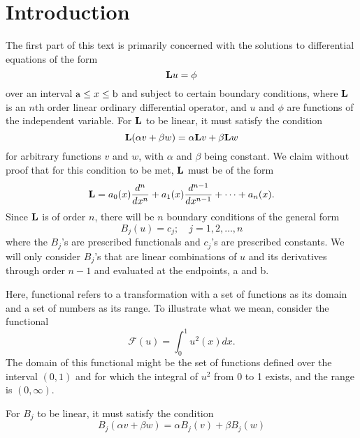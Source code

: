 \section{Introduction}
The first part of this text is primarily concerned with the solutions to differential equations of the form
\begin{equation}
    \mathrm{\bf{L}} u=\phi
\end{equation}
over an interval \(\mathrm{a} \leq x \leq \mathrm{b}\) and subject to certain boundary conditions, where \(\mathrm{\bf{L}}\) is an \(n\)th order linear ordinary differential operator, and \(u\) and \(\phi\) are functions of the independent variable. For \(\mathrm{\bf{L}}\) to be linear, it must satisfy the condition
\begin{equation}
	\mathrm{\bf{L}}(\alpha v + \beta w) = \alpha \mathrm{\bf{L}} v + \beta \mathrm{\bf{L}} w
\end{equation}
for arbitrary functions \(v\) and \(w\), with \(\alpha\) and \(\beta\) being constant. We claim without proof that for this condition to be met, \(\mathrm{\bf{L}}\) must be of the form
\begin{equation} 
	\mathrm{\bf{L}} = a_0(x) \frac{d^n}{dx^n} + a_1(x) \frac{d^{n-1}}{dx^{n-1}} + \cdots + a_n(x).
\end{equation}
Since \(\mathrm{\bf{L}}\) is of order \(n\), there will be \(n\) boundary conditions of the general form 
\begin{equation}
	B_j (u) = c_j;\quad j=1,2,\dots,n
\end{equation}
where the \(B_j\)'s are prescribed functionals and \(c_j\)'s are prescribed constants. We will only consider \(B_j\)'s that are linear combinations of \(u\) and its derivatives through order \(n-1\) and evaluated at the endpoints, a and b. 

Here, functional refers to a transformation with a set of functions as its domain and a set of numbers as its range. To illustrate what we mean, consider the functional 
\begin{equation}
	\mathcal{F}(u) = \int_{0}^{1} u^2(x)dx.
\end{equation}
The domain of this functional might be the set of functions defined over the interval \((0,1)\) and for which the integral of \(u^2\) from 0 to 1 exists, and the range is \((0, \infty)\).

For \(B_j\) to be linear, it must satisfy the condition
\begin{equation}
	B_j(\alpha v + \beta w) = \alpha B_j (v) + \beta B_j(w)
\end{equation}